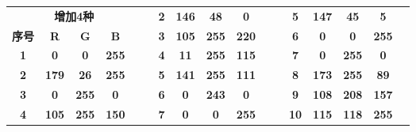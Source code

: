 \begin{table}[H]
\begin{tabular}{|ccccc|r|ccccr|r|ccccc|}
		\multicolumn{5}{c}{\textbf{增加4种}}     &       & \textbf{2} & \textbf{146} & \textbf{48} & \textbf{0} & \cellcolor[rgb]{ .573,  .188,  0} &       & \textbf{5} & \textbf{147} & \textbf{45} & \textbf{5} & \cellcolor[rgb]{ .576,  .176,  .02} \\
		\cmidrule{1-5}    \textbf{序号} & \textbf{R} & \textbf{G} & \textbf{B} &       &       & \textbf{3} & \textbf{105} & \textbf{255} & \textbf{220} & \cellcolor[rgb]{ .412,  1,  .863} &       & \textbf{6} & \textbf{0} & \textbf{0} & \textbf{255} & \cellcolor[rgb]{ 0,  0,  1} \\
		\textbf{1} & \textbf{0} & \textbf{0} & \textbf{255} & \cellcolor[rgb]{ 0,  0,  1} &       & \textbf{4} & \textbf{11} & \textbf{255} & \textbf{115} & \cellcolor[rgb]{ .043,  1,  .451} &       & \textbf{7} & \textbf{0} & \textbf{255} & \textbf{0} & \cellcolor[rgb]{ 0,  1,  0} \\
		\textbf{2} & \textbf{179} & \textbf{26} & \textbf{255} & \cellcolor[rgb]{ .702,  .102,  1} &       & \textbf{5} & \textbf{141} & \textbf{255} & \textbf{111} & \cellcolor[rgb]{ .553,  1,  .435} &       & \textbf{8} & \textbf{173} & \textbf{255} & \textbf{89} & \cellcolor[rgb]{ .678,  1,  .349} \\
		\textbf{3} & \textbf{0} & \textbf{255} & \textbf{0} & \cellcolor[rgb]{ 0,  1,  0} &       & \textbf{6} & \textbf{0} & \textbf{243} & \textbf{0} & \cellcolor[rgb]{ 0,  .953,  0} &       & \textbf{9} & \textbf{108} & \textbf{208} & \textbf{157} & \cellcolor[rgb]{ .424,  .816,  .616} \\
		\textbf{4} & \textbf{105} & \textbf{255} & \textbf{150} & \cellcolor[rgb]{ .412,  1,  .588} &       & \textbf{7} & \textbf{0} & \textbf{0} & \textbf{255} & \cellcolor[rgb]{ 0,  0,  1} &       & \textbf{10} & \textbf{115} & \textbf{118} & \textbf{255} & \cellcolor[rgb]{ .451,  .463,  1} \\
		\cmidrule{1-5}\cmidrule{7-11}\cmidrule{13-17}    \end{tabular}%
	\label{wt2fb}%
\end{table}%
